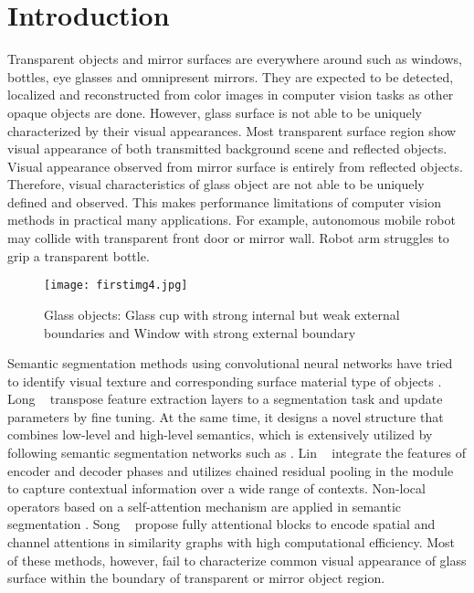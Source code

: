 \documentclass[10pt,twocolumn,letterpaper]{article}
\begin{document}
\section{Introduction}
\label{sec:intro}
Transparent objects and mirror surfaces are everywhere around such as windows, bottles, eye glasses and omnipresent mirrors. They are expected to be detected, localized and reconstructed from color images in computer vision tasks as other opaque objects are done. However, glass surface is not able to be uniquely characterized by their visual appearances. Most transparent surface region show visual appearance of both transmitted background scene and reflected objects. Visual appearance observed from mirror surface is entirely from reflected objects. Therefore, visual characteristics of glass object are not able to be uniquely defined and observed. This makes performance limitations of computer vision methods in practical many applications. For example, autonomous mobile robot may collide with transparent front door or mirror wall. Robot arm struggles to grip a transparent bottle. 
\begin{figure}
  \centering
\texttt{[image: firstimg4.jpg]}
\caption{Glass objects: Glass cup with strong internal but weak external boundaries and Window with strong external boundary}
\vspace*{-4mm}
  \label{firstpic}
\end{figure}
Semantic segmentation methods using convolutional neural networks \cite{zhang2023understanding} have tried to identify visual texture and corresponding surface material type of objects \cite{long2015fully} \cite{ronneberger2015u} \cite{badrinarayanan2017segnet} \cite{zhang2023complete} \cite{zhang2023one}. Long \etal~\cite{long2015fully} transpose feature extraction layers to a segmentation task and update parameters by fine tuning. At the same time, it designs a novel structure that combines low-level and high-level semantics, which is extensively utilized by following semantic segmentation networks such as \cite{zhao2017pyramid} .
Lin \etal~\cite{lin2019refinenet} integrate the features of encoder and decoder phases and utilizes chained residual pooling in the module to capture contextual information over a wide range of contexts. Non-local operators \cite{wang2018non} based on a self-attention mechanism \cite{chorowski2015attention} are applied in semantic segmentation \cite{fu2019dual}\cite{babiloni2020tesa}\cite{zhang2023faster}. Song \etal~\cite{song2022fully} propose fully attentional blocks to encode spatial and channel attentions in similarity graphs with high computational efficiency. Most of these methods, however, fail to characterize common visual appearance of glass surface within the boundary of transparent or mirror object region.
\end{document}

